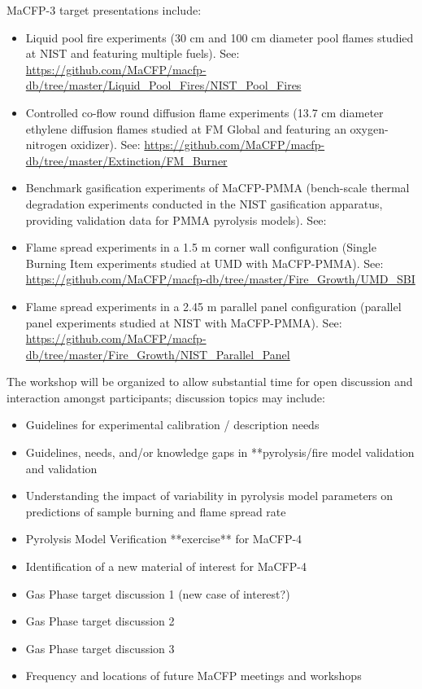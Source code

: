 \documentclass[12pt,demo]{article}
\begin{document}
MaCFP-3 target presentations include:
\begin{itemize}[noitemsep]
\item Liquid pool fire experiments (30 cm and 100 cm diameter pool flames studied at NIST and featuring multiple fuels). See: \url{https://github.com/MaCFP/macfp-db/tree/master/Liquid_Pool_Fires/NIST_Pool_Fires}
\item Controlled co-flow round diffusion flame experiments (13.7 cm diameter ethylene diffusion flames studied at FM Global and featuring an oxygen-nitrogen oxidizer). See: \url{https://github.com/MaCFP/macfp-db/tree/master/Extinction/FM_Burner}
\item Benchmark gasification experiments of MaCFP-PMMA (bench-scale thermal degradation experiments conducted in the NIST gasification apparatus, providing validation data for PMMA pyrolysis models). See: %
\item Flame spread experiments in a 1.5 m corner wall configuration (Single Burning Item experiments studied at UMD with MaCFP-PMMA). See: \url{https://github.com/MaCFP/macfp-db/tree/master/Fire_Growth/UMD_SBI}
\item Flame spread experiments in a 2.45 m parallel panel configuration (parallel panel experiments studied at NIST with MaCFP-PMMA). See: \url{https://github.com/MaCFP/macfp-db/tree/master/Fire_Growth/NIST_Parallel_Panel}
 \end{itemize}
 
\newpage
The workshop will be organized to allow substantial time for open discussion and interaction amongst participants; discussion topics may include:

\begin{itemize}[noitemsep]
\item Guidelines for experimental calibration / description needs
\item Guidelines, needs, and/or knowledge gaps in **pyrolysis/fire model validation and validation
\item Understanding the impact of variability in pyrolysis model parameters on predictions of sample burning and flame spread rate
\item Pyrolysis Model Verification **exercise** for MaCFP-4
\item Identification of a new material of interest for MaCFP-4
\item Gas Phase target discussion 1 (new case of interest?)
\item Gas Phase target discussion 2
\item Gas Phase target discussion 3
\item Frequency and locations of future MaCFP meetings and workshops
\end{itemize}
\clearpage
\end{document}
